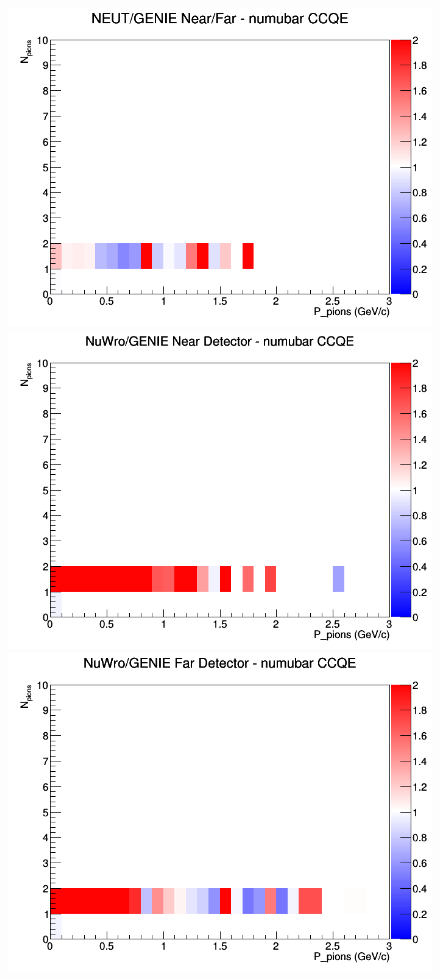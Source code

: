 \documentclass[12pt]{article}
\begin{document}
\begin{figure}[h]
\endminipage
{}
\includegraphics[width=\linewidth]{N_P/nominal/pions/ratios/CCQE_NEUT_GENIE_numubar_NF_N_P.png}
\endminipage
\newline
{}
\includegraphics[width=\linewidth]{N_P/nominal/pions/ratios/CCQE_NuWro_GENIE_numubar_near_N_P.png}
\endminipage
{}
\includegraphics[width=\linewidth]{N_P/nominal/pions/ratios/CCQE_NuWro_GENIE_numubar_far_N_P.png}

\end{figure}
\end{document}
